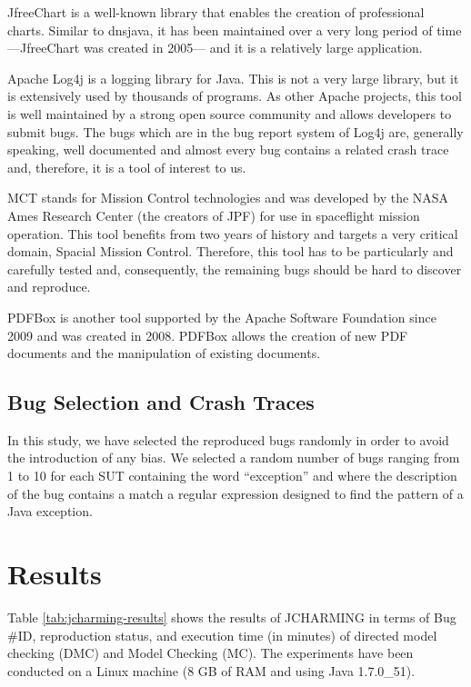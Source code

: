 \documentclass[times]{smrauth}
\begin{document}
JfreeChart \cite{ObjectRefineryLimited2005} is a well-known library that enables the
creation of professional charts. Similar to dnsjava, it has been
maintained over a very long period of time —JfreeChart was
created in 2005— and it is a relatively large application.

Apache Log4j \cite{TheApacheSoftwareFoundation1999} is a logging library for Java. This is not a
very large library, but it is extensively used by thousands of
programs. As other Apache projects, this tool is well
maintained by a strong open source community and allows
developers to submit bugs. The bugs which are in the bug
report system of Log4j are, generally speaking, well
documented and almost every bug contains a related crash
trace and, therefore, it is a tool of interest to us.

MCT \cite{NASA2009} stands for Mission Control technologies and was
developed by the NASA Ames Research Center (the creators
of JPF) for use in spaceflight mission operation. This tool
benefits from two years of history and targets a very critical
domain, Spacial Mission Control. Therefore, this tool has to
be particularly and carefully tested and, consequently, the
remaining bugs should be hard to discover and reproduce.

PDFBox \cite{ApacheSoftwareFoundation2014} is another tool supported by the Apache
Software Foundation since 2009 and was created in 2008.
PDFBox allows the creation of new PDF documents and the
manipulation of existing documents.

\subsection{Bug Selection and Crash Traces}

In this study, we have selected the reproduced bugs randomly
in order to avoid the introduction of any bias. We selected a
random number of bugs ranging from 1 to 10 for each SUT containing the word ``exception'' and where the description of
the bug contains a match a regular expression designed to find the pattern of a
Java exception.

\section{Results\label{sec:results}}

Table \ref{tab:jcharming-results} shows the results of JCHARMING in terms of Bug
\#ID, reproduction status, and execution time (in minutes) of
directed model checking (DMC) and Model Checking (MC).
The experiments have been conducted on a Linux machine (8
GB of RAM and using Java 1.7.0\_51).
\end{document}
